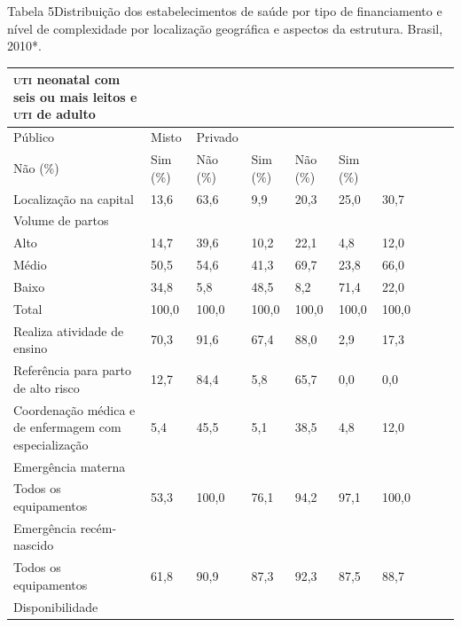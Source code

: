 \documentclass{article}
\begin{document}
Tabela 5Distribuição dos estabelecimentos de saúde por tipo de financiamento
e nível de complexidade por localização geográfica e aspectos da
estrutura. Brasil, 2010*.
\begin{table}
\begin{xtabular}{ l l | l | l l | l | l | l | l | l }
\hline
\textsc{uti} neonatal com seis ou mais leitos e \textsc{uti} de
adulto\\ \hline
Público & Misto & Privado\\ \hline
Não (\%) & Sim (\%) & Não (\%) & Sim (\%) & Não (\%) & Sim (\%)\\ \hline
Localização na capital
& 13,6
& 63,6
& 9,9
& 20,3
& 25,0
& 30,7
\\ \hline

Volume de partos
&
&
&
&
&
&
\\ \hline

Alto
& 14,7
& 39,6
& 10,2
& 22,1
& 4,8
& 12,0
\\ \hline

Médio
& 50,5
& 54,6
& 41,3
& 69,7
& 23,8
& 66,0
\\ \hline

Baixo
& 34,8
& 5,8
& 48,5
& 8,2
& 71,4
& 22,0
\\ \hline

Total
& 100,0
& 100,0
& 100,0
& 100,0
& 100,0
& 100,0
\\ \hline

Realiza atividade de ensino
& 70,3
& 91,6
& 67,4
& 88,0
& 2,9
& 17,3
\\ \hline

Referência para parto de alto risco
& 12,7
& 84,4
& 5,8
& 65,7
& 0,0
& 0,0
\\ \hline

Coordenação médica e de enfermagem com
especialização
& 5,4
& 45,5
& 5,1
& 38,5
& 4,8
& 12,0
\\ \hline

Emergência materna
&
&
&
&
&
&
\\ \hline

Todos os equipamentos
& 53,3
& 100,0
& 76,1
& 94,2
& 97,1
& 100,0
\\ \hline

Emergência recém-nascido
&
&
&
&
&
&
\\ \hline

Todos os equipamentos
& 61,8
& 90,9
& 87,3
& 92,3
& 87,5
& 88,7
\\ \hline

Disponibilidade
&
&
&
&
&
&
\\ \hline


\end{xtabular}
\end{table}
\end{document}
